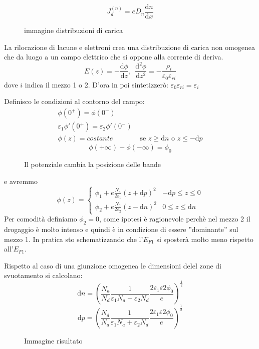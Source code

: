 \documentclass[]{article}
\newcommand{\de}[2]{\ensuremath{\frac{\mathrm{d} #1}{\mathrm{d} #2}}}
\newcommand{\df}{\ensuremath{\mathrm{d}}}
\newcommand{\lr}[3]{\ensuremath{\left#1 #3 \right#2}}
\newcommand{\lrt}[1]{\lr{(}{)}{#1}}
\numberwithin{equation}{subsection}
\begin{document}
	\begin{equation}
	J_{d}^{(n)}  = e D_n \de nx
	\end{equation}
	
	\begin{figure}
		immagine distribuzioni di carica
	\end{figure}
	
	La rilocazione di lacune e elettroni crea una distribuzione di carica non omogenea che da luogo a un campo elettrico che si oppone alla corrente di deriva. 
	\begin{equation}
	E(z) = -\de{\phi}z, \ \ \de{^2\phi}{z^2} = -\frac{\rho_i}{\varepsilon_0 \varepsilon_{r i}}
	\end{equation}
	dove $i$ indica il mezzo 1 o 2. D'ora in poi sintetizzer\`o:  $\varepsilon_0 \varepsilon_{r i} = \varepsilon_i$
	
	Definisco le condizioni al contorno del campo:
	\begin{eqnarray}
	\phi(0^+) = 	\phi(0^-)\\
	\varepsilon_1 \phi'(0^+) = 	\varepsilon_2 \phi'(0^-)\\
	\phi(z) = costante & \text{ se } z \geq \df n\text{ o } z \leq -\df p
	\end{eqnarray}
	\begin{equation}
	\phi(+\infty) - \phi(-\infty) = \phi_0
\end{equation}

	\begin{figure}
		\caption{Il potenziale cambia la posizione delle bande}
	\end{figure}
	e avremmo 
	\begin{equation}
	\phi(z) = \lr\{ . {\begin{array}{lr}
\phi_1 + e \frac{N_a}{2\varepsilon_1}\lrt{z+\df p}^2 & -\df p \leq z \leq 0\\
\phi_2 + e \frac{N_a}{2\varepsilon_2}\lrt{z-\df n}^2 & 0 \leq z \leq \df n
		\end{array}}
	\end{equation}
	Per comodit\`a definiamo $\phi_2 = 0$, come ipotesi \`e ragionevole perch\`e nel mezzo 2 il drogaggio \`e molto intenso e quindi \`e in condizione di essere ''dominante'' sul mezzo 1. In pratica sto schematizzando che l'$E_{F1}$ si sposter\`a molto meno rispetto all'$E_{F1}$.
	
	Rispetto al caso di una giunzione omogenea le dimensioni delel zone di svuotamento si calcolano:
	\begin{equation}
	\df n = \lrt{\frac{N_a}{N_d} \frac{1}{\varepsilon_1 N_a + \varepsilon_2 N_d} \frac{2\varepsilon_1 \varepsilon 2 \phi_0 }{e}}^{\frac 12}
	\end{equation}
		\begin{equation}
		\df p = \lrt{\frac{N_d}{N_a} \frac{1}{\varepsilon_1 N_a + \varepsilon_2 N_d} \frac{2\varepsilon_1 \varepsilon 2 \phi_0 }{e}}^{\frac 12}
		\end{equation}
		\begin{figure}
			Immagine risultato
		\end{figure}
\end{document}
